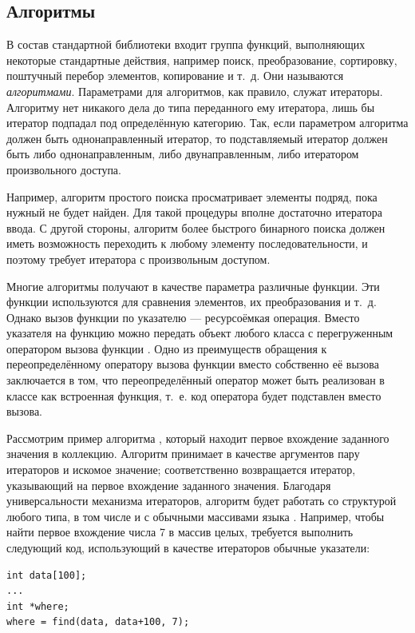 \subsection[Алгоритмы]{Алгоритмы}
В состав стандартной библиотеки входит группа функций, выполняющих некоторые стандартные действия, например поиск,
преобразование, сортировку, поштучный перебор элементов, копирование и т.~д. Они называются
\emph{алгоритмами}. Параметрами для алгоритмов, как правило, служат
итераторы. Алгоритму нет никакого дела до типа переданного ему итератора, лишь бы итератор подпадал под определённую
категорию. Так, если параметром алгоритма должен быть однонаправленный итератор, то подставляемый итератор должен быть
либо однонаправленным, либо двунаправленным, либо итератором произвольного доступа. 

Например, алгоритм простого поиска  просматривает элементы подряд, пока нужный не будет
найден. Для такой процедуры вполне достаточно итератора ввода. С другой стороны, алгоритм более быстрого бинарного
поиска  должен иметь возможность переходить к любому элементу последовательности, и
поэтому требует итератора с произвольным доступом.

Многие алгоритмы получают в качестве параметра различные функции. Эти функции используются для сравнения элементов, их
преобразования и т.~д. Однако вызов функции по указателю --- ресурсоёмкая операция. Вместо указателя на функцию можно
передать объект любого класса с перегруженным оператором вызова функции . Одно из
преимуществ обращения к переопределённому оператору вызова функции вместо собственно её вызова заключается в том, что
переопределённый оператор может быть реализован в классе как встроенная функция, т.~е. код оператора будет подставлен
вместо вызова.

Рассмотрим пример алгоритма , который находит первое вхождение заданного значения в коллекцию.
Алгоритм принимает в качестве аргументов пару итераторов и искомое значение; соответственно возвращается итератор,
указывающий на первое вхождение заданного значения. Благодаря универсальности механизма итераторов, алгоритм будет
работать со структурой любого типа, в том числе и с обычными массивами языка . Например, чтобы найти первое вхождение
числа 7 в массив целых, требуется выполнить следующий код, использующий в качестве итераторов обычные указатели:
\begin{lstlisting}
int data[100];
...
int *where;
where = find(data, data+100, 7);
\end{lstlisting}

